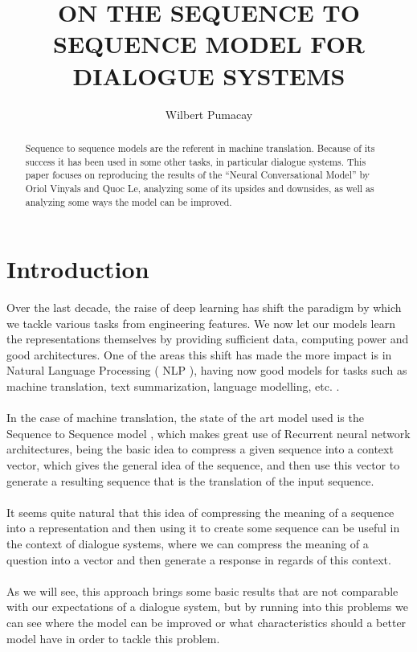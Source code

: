 \documentclass{llncs}
\begin{document}
\title{ON THE SEQUENCE TO SEQUENCE MODEL FOR DIALOGUE SYSTEMS}

\author{Wilbert Pumacay}


\maketitle

\begin{abstract}

Sequence to sequence models are the referent in machine translation. Because of its success it has been used in some other tasks, in particular dialogue systems. This paper focuses on reproducing the results of the ``Neural Conversational Model'' by Oriol Vinyals and Quoc Le, analyzing some of its upsides and downsides, as well as analyzing some ways the model can be improved.


\end{abstract}

\section{Introduction}

Over the last decade, the raise of deep learning has shift the paradigm by which we tackle various tasks from engineering features. We now let our models learn the representations themselves by providing sufficient data, computing power and good architectures. One of the areas this shift has made the more impact is in Natural Language Processing ( NLP ), having now good models for tasks such as machine translation, text summarization, language modelling, etc. .
\\
\\
In the case of machine translation, the state of the art model used is the Sequence to Sequence model \cite{seq2seq}, which makes great use of Recurrent neural network architectures, being the basic idea to compress a given sequence into a context vector, which gives the general idea of the sequence, and then use this vector to generate a resulting sequence that is the translation of the input sequence.
\\
\\
It seems quite natural that this idea of compressing the meaning of a sequence into a representation and then using it to create some sequence can be useful in the context of dialogue systems, where we can compress the meaning of a question into a vector and then generate a response in regards of this context.
\\
\\
As we will see, this approach brings some basic results that are not comparable with our expectations of a dialogue system, but by running into this problems we can see where the model can be improved or what characteristics should a better model have in order to tackle this problem.
\end{document}
